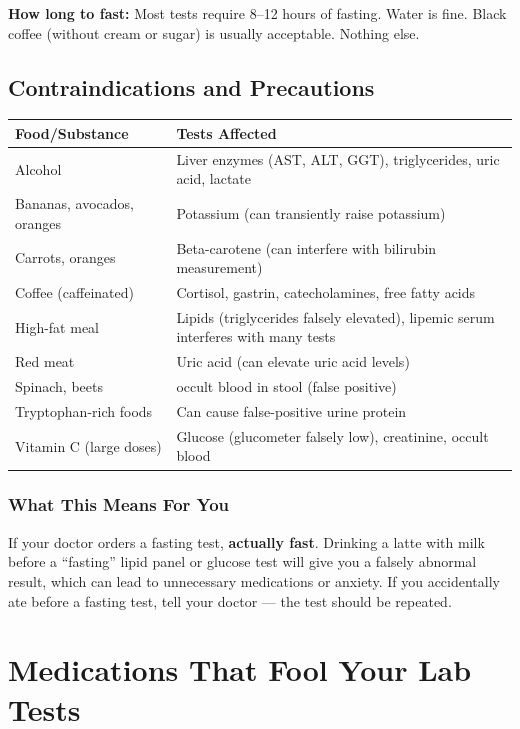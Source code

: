 \textbf{How long to fast:} Most tests require 8--12 hours of fasting. Water is fine. Black coffee (without cream or sugar) is usually acceptable. Nothing else.

\subsection{Contraindications and Precautions}

\begin{longtable}{@{}ll@{}}
\toprule
\textbf{Food/Substance} & \textbf{Tests Affected} \\
\midrule
Alcohol & Liver enzymes (AST, ALT, GGT), triglycerides, uric acid, lactate \\
Bananas, avocados, oranges & Potassium (can transiently raise potassium) \\
Carrots, oranges & Beta-carotene (can interfere with bilirubin measurement) \\
Coffee (caffeinated) & Cortisol, gastrin, catecholamines, free fatty acids \\
High-fat meal & Lipids (triglycerides falsely elevated), lipemic serum interferes with many tests \\
Red meat & Uric acid (can elevate uric acid levels) \\
Spinach, beets & occult blood in stool (false positive) \\
Tryptophan-rich foods & Can cause false-positive urine protein \\
Vitamin C (large doses) & Glucose (glucometer falsely low), creatinine, occult blood \\
\bottomrule
\end{longtable}

\subsubsection{What This Means For You}

If your doctor orders a fasting test, \textbf{actually fast}. Drinking a latte with milk before a ``fasting'' lipid panel or glucose test will give you a falsely abnormal result, which can lead to unnecessary medications or anxiety. If you accidentally ate before a fasting test, tell your doctor --- the test should be repeated.

\clearpage
\section{Medications That Fool Your Lab Tests}


